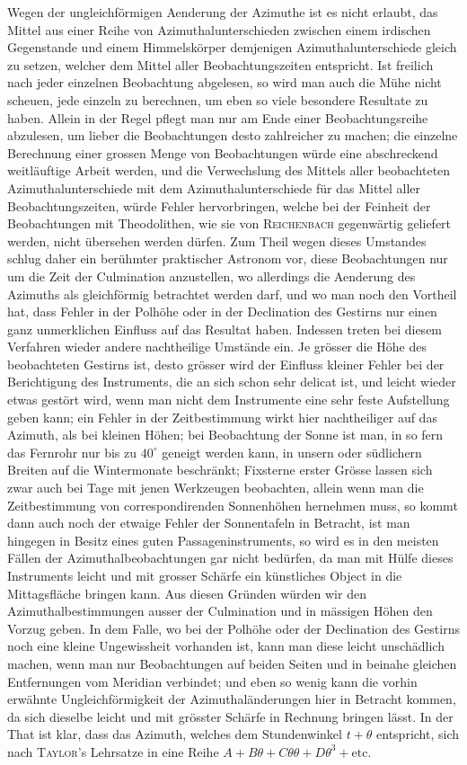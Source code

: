 Wegen der ungleichförmigen Aenderung der Azimuthe ist es nicht erlaubt, das Mittel aus einer Reihe von Azimuthalunterschieden zwischen einem irdischen Gegenstande und einem Himmelskörper demjenigen Azimuthalunterschiede gleich zu setzen, welcher dem Mittel aller Beobachtungszeiten entspricht. Ist freilich nach jeder einzelnen Beobachtung abgelesen, so wird man auch die Mühe nicht scheuen, jede einzeln zu berechnen, um eben so viele besondere Resultate zu haben. Allein in der Regel pflegt man nur am Ende einer Beobachtungsreihe abzulesen, um lieber die Beobachtungen desto zahlreicher zu machen; die einzelne Berechnung einer grossen Menge von Beobachtungen würde eine abschreckend weitläuftige Arbeit werden, und die Verwechslung des Mittels aller beobachteten Azimuthalunterschiede mit dem Azimuthalunterschiede für das Mittel aller Beobachtungszeiten, würde Fehler hervorbringen, welche bei der Feinheit der Beobachtungen mit Theodolithen, wie sie von \textsc{Reichenbach} gegenwärtig geliefert werden, nicht übersehen werden dürfen. Zum Theil wegen dieses Umstandes schlug daher ein berühmter praktischer Astronom vor, diese Beobachtungen nur um die Zeit der Culmination anzustellen, wo allerdings die Aenderung des Azimuths als gleichförmig betrachtet werden darf, und wo man noch den Vortheil hat, dass Fehler in der Polhöhe oder in der Declination des Gestirns nur einen ganz unmerklichen Einfluss auf das Resultat haben. Indessen treten bei diesem Verfahren wieder andere nachtheilige Umstände ein. Je grösser die Höhe des beobachteten Gestirns ist, desto grösser wird der Einfluss kleiner Fehler bei der Berichtigung des Instruments, die an sich schon sehr delicat ist, und leicht wieder etwas gestört wird, wenn man nicht dem Instrumente eine sehr feste Aufstellung geben kann; ein Fehler in der Zeitbestimmung wirkt hier nachtheiliger auf das Azimuth, als bei kleinen Höhen; bei Beobachtung der Sonne ist man, in so fern das Fernrohr nur bis zu $40^{\circ}$ geneigt werden kann, in unsern oder südlichern Breiten auf die Wintermonate beschränkt; Fixsterne erster Grösse lassen sich zwar auch bei Tage mit jenen Werkzeugen beobachten, allein wenn man die Zeitbestimmung von correspondirenden Sonnenhöhen hernehmen muss, so kommt dann auch noch der etwaige Fehler der Sonnentafeln in Betracht, ist man hingegen in Besitz eines guten Passageninstruments, so wird es in den meisten Fällen der Azimuthalbeobachtungen gar nicht bedürfen, da man mit Hülfe dieses Instruments leicht und mit grosser Schärfe ein künstliches Object in die Mittagsfläche bringen kann. Aus diesen Gründen würden wir den Azimuthalbestimmungen ausser der Culmination und in mässigen Höhen den Vorzug geben. In dem Falle, wo bei der Polhöhe oder der Declination des Gestirns noch eine kleine Ungewissheit vorhanden ist, kann man diese leicht unschädlich machen, wenn man nur Beobachtungen auf beiden Seiten und in beinahe gleichen Entfernungen vom Meridian verbindet; und eben so wenig kann die vorhin erwähnte Ungleichförmigkeit der Azimuthaländerungen hier in Betracht kommen, da sich dieselbe leicht und mit grösster Schärfe in Rechnung bringen lässt. In der That ist klar, dass das Azimuth, welches dem Stundenwinkel $t+\theta$ entspricht, sich nach \textsc{Taylor}'s Lehrsatze in eine Reihe $A+B\theta+C\theta\theta+D\theta^3+\text{etc.}$ 